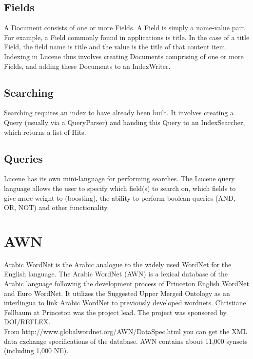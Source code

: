 \subsection{Fields}
A Document consists of one or more Fields. A Field is simply a name-value pair. For example, a Field commonly found in applications is title. In the case of a title Field, the field name is title and the value is the title of that content item. Indexing in Lucene thus involves creating Documents comprising of one or more Fields, and adding these Documents to an IndexWriter.



\subsection{Searching}
Searching requires an index to have already been built. It involves creating a Query (usually via a QueryParser) and handing this Query to an IndexSearcher, which returns a list of Hits.
\subsection{Queries}
Lucene has its own mini-language for performing searches.  The Lucene query language allows the user to specify which field(s) to search on, which fields to give more weight to (boosting), the ability to perform boolean queries (AND, OR, NOT) and other functionality.


\section{AWN}
Arabic WordNet is the Arabic analogue to the widely used WordNet for the English language. The Arabic WordNet (AWN) is a lexical database of the Arabic language following the development process of Princeton English WordNet and Euro WordNet. It utilizes the Suggested Upper Merged Ontology as an interlingua to link Arabic WordNet to previously developed wordnets. Christiane Fellbaum at Princeton was the project lead. The project was sponsored by DOI/REFLEX.\\
From http://www.globalwordnet.org/AWN/DataSpec.html you can get the XML data exchange specifications of the database. AWN contains about 11,000 synsets (including 1,000 NE).\\

